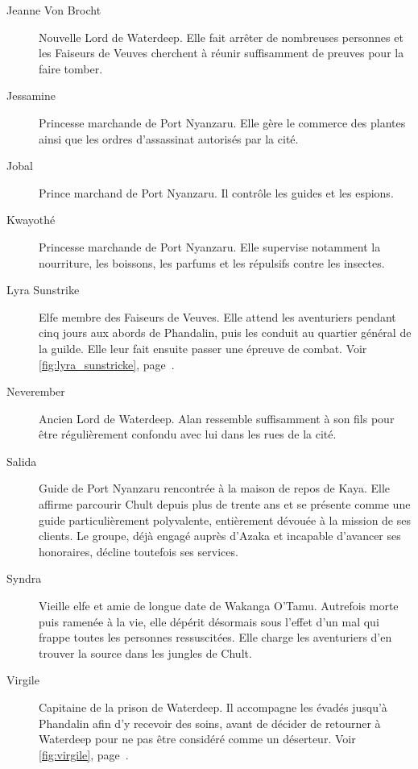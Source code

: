 \begin{description}
    \item[Jeanne Von Brocht]
    Nouvelle Lord de Waterdeep. Elle fait arrêter de nombreuses personnes et
    les Faiseurs de Veuves cherchent à réunir suffisamment de preuves pour la
    faire tomber.

    \item[Jessamine]
    Princesse marchande de Port Nyanzaru. Elle gère le commerce
    des plantes ainsi que les ordres d'assassinat autorisés par la cité.

    \item[Jobal]
    Prince marchand de Port Nyanzaru. Il contrôle les guides
    et les espions.

    \item[Kwayothé]
    Princesse marchande de Port Nyanzaru. Elle supervise notamment
    la nourriture, les boissons, les parfums et les répulsifs contre les
    insectes.

    \item[Lyra Sunstrike]
    Elfe membre des Faiseurs de Veuves. Elle attend les aventuriers pendant
    cinq jours aux abords de Phandalin, puis les conduit au quartier général
    de la guilde. Elle leur fait ensuite passer une épreuve de combat.
    Voir \autoref{fig:lyra_sunstricke},
    page~\pageref{fig:lyra_sunstricke}.

    \item[Neverember]
    Ancien Lord de Waterdeep. Alan ressemble suffisamment à son fils pour être
    régulièrement confondu avec lui dans les rues de la cité.

    \item[Salida]
    Guide de Port Nyanzaru rencontrée à la maison de repos de Kaya. Elle affirme
    parcourir Chult depuis plus de trente ans et se présente comme une guide
    particulièrement polyvalente, entièrement dévouée à la mission de ses
    clients. Le groupe, déjà engagé auprès d'Azaka et incapable d'avancer ses
    honoraires, décline toutefois ses services.

    \item[Syndra]
    Vieille elfe et amie de longue date de Wakanga O'Tamu. Autrefois morte puis
    ramenée à la vie, elle dépérit désormais sous l'effet d'un mal qui frappe
    toutes les personnes ressuscitées. Elle charge les aventuriers d'en trouver
    la source dans les jungles de Chult.

    \item[Virgile]
    Capitaine de la prison de Waterdeep. Il accompagne les évadés jusqu'à
    Phandalin afin d'y recevoir des soins, avant de décider de retourner à
    Waterdeep pour ne pas être considéré comme un déserteur.
    Voir \autoref{fig:virgile}, page~\pageref{fig:virgile}.


\end{description}
